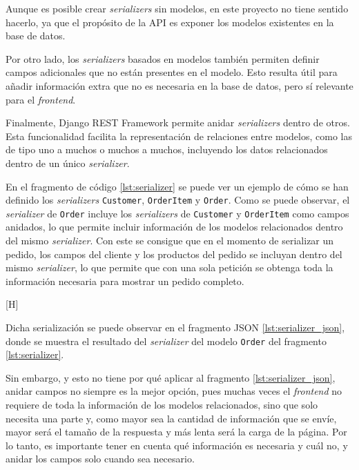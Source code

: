 Aunque es posible crear \textit{serializers} sin modelos, en este proyecto no tiene sentido hacerlo, ya que el propósito de la API es exponer los modelos existentes en la base de datos.

Por otro lado, los \textit{serializers} basados en modelos también permiten definir campos adicionales que no están presentes en el modelo. Esto resulta útil para añadir información extra que no es necesaria en la base de datos, pero sí relevante para el \textit{frontend}.

Finalmente, Django REST Framework permite anidar \textit{serializers} dentro de otros. Esta funcionalidad facilita la representación de relaciones entre modelos, como las de tipo uno a muchos o muchos a muchos, incluyendo los datos relacionados dentro de un único \textit{serializer}.

En el fragmento de código \ref{lst:serializer} se puede ver un ejemplo de cómo se han definido los \textit{serializers} \texttt{Customer}, \texttt{OrderItem} y \texttt{Order}. Como se puede observar, el \textit{serializer} de \texttt{Order} incluye los \textit{serializers} de \texttt{Customer} y \texttt{OrderItem} como campos anidados, lo que permite incluir información de los modelos relacionados dentro del mismo \textit{serializer}. Con este se consigue que en el momento de serializar un pedido, los campos del cliente y los productos del pedido se incluyan dentro del mismo \textit{serializer}, lo que permite que con una sola petición se obtenga toda la información necesaria para mostrar un pedido completo.

\begin{center}[H]
    \begin{minipage}{0.8\textwidth}
        
    \end{minipage}
\end{center}

Dicha serialización se puede observar en el fragmento JSON \ref{lst:serializer_json}, donde se muestra el resultado del \textit{serializer} del modelo \texttt{Order} del fragmento \ref{lst:serializer}.

Sin embargo, y esto no tiene por qué aplicar al fragmento \ref{lst:serializer_json}, anidar campos no siempre es la mejor opción, pues muchas veces el \textit{frontend} no requiere de toda la información de los modelos relacionados, sino que solo necesita una parte y, como mayor sea la cantidad de información que se envíe, mayor será el tamaño de la respuesta y más lenta será la carga de la página. Por lo tanto, es importante tener en cuenta qué información es necesaria y cuál no, y anidar los campos solo cuando sea necesario.


